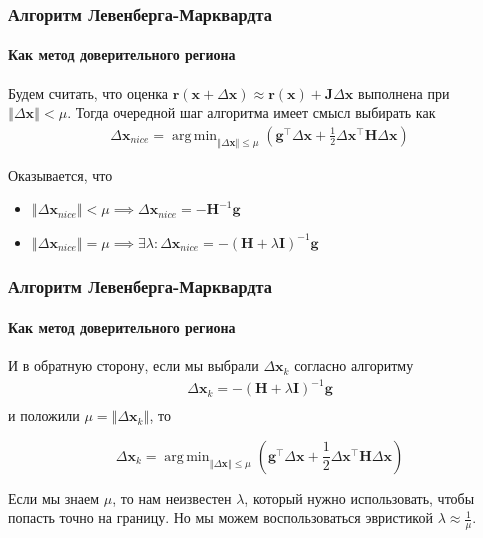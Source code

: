 \documentclass[notheorems,aspectratio=169]{beamer}
\DeclareMathOperator*{\argmin}{arg\,min}
\begin{document}
\begin{frame}
  \frametitle{Алгоритм Левенберга-Марквардта}
  \framesubtitle{Как метод доверительного региона}
  Будем считать, что оценка $\mathbf{r}\left(\mathbf{x}+\Delta\mathbf{x}\right)\approx\mathbf{r}\left(\mathbf{x}\right)+\mathbf{J}\Delta\mathbf{x}$ выполнена при $\left\Vert\Delta\mathbf{x}\right\Vert<\mu$. Тогда очередной шаг алгоритма имеет смысл выбирать как
  \begin{equation*}
    \begin{gathered}
      \Delta\mathbf{x}_{nice}=\argmin_{\left\Vert\Delta\mathbf{x}\right\Vert\leq\mu}\left(\mathbf{g}^\intercal\Delta\mathbf{x}+\frac{1}{2}\Delta\mathbf{x}^\intercal\mathbf{H}\Delta\mathbf{x}\right)
    \end{gathered}
  \end{equation*}

  Оказывается, что
  \begin{itemize}
    \item $\left\Vert\Delta\mathbf{x}_{nice}\right\Vert<\mu \implies \Delta\mathbf{x}_{nice}=-\mathbf{H}^{-1}\mathbf{g}$
    \item $\left\Vert\Delta\mathbf{x}_{nice}\right\Vert=\mu \implies \exists\lambda: \Delta\mathbf{x}_{nice}=-\left(\mathbf{H}+\lambda\mathbf{I}\right)^{-1}\mathbf{g}$
  \end{itemize}
  
\end{frame}

\begin{frame}
  \frametitle{Алгоритм Левенберга-Марквардта}
  \framesubtitle{Как метод доверительного региона}
  И в обратную сторону, если мы выбрали $\Delta\mathbf{x}_k$ согласно алгоритму
  \begin{equation*}
    \begin{gathered}
      \Delta\mathbf{x}_k=-\left(\mathbf{H}+\lambda\mathbf{I}\right)^{-1}\mathbf{g} \\
    \end{gathered}
  \end{equation*}
  и положили $\mu=\left\Vert\Delta\mathbf{x}_k\right\Vert$, то 

  \begin{equation*}
    \Delta\mathbf{x}_k=\argmin_{\left\Vert\Delta\mathbf{x}\right\Vert\leq\mu}\left(\mathbf{g}^\intercal\Delta\mathbf{x}+\frac{1}{2}\Delta\mathbf{x}^\intercal\mathbf{H}\Delta\mathbf{x}\right)
    \end{equation*}

    Если мы знаем $\mu$, то нам неизвестен $\lambda$, который нужно использовать, чтобы попасть точно на границу. Но мы можем воспользоваться эвристикой $\lambda\approx\frac{1}{\mu}$.
\end{frame}
\end{document}
